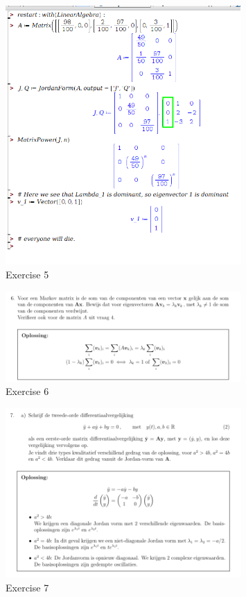 \documentclass[a4paper]{report}
\begin{document}
\begin{figure}[H]
	\centering
	\includegraphics[width=0.8\textwidth]{assets/huis_3_ex_5.png}
	\caption{Exercise 5}
	\label{fig:huis_3_ex_5}
\end{figure}

\begin{figure}[H]
	\centering
	\includegraphics[width=0.8\textwidth]{assets/huis_3_ex_6.png}
	\caption{Exercise 6}
	\label{fig:huis_3_ex_6}
\end{figure}

\begin{figure}[H]
	\centering
	\includegraphics[width=0.8\textwidth]{assets/huis_3_ex_7.png}
	\caption{Exercise 7}
	\label{fig:huis_3_ex_7}
\end{figure}
\end{document}
